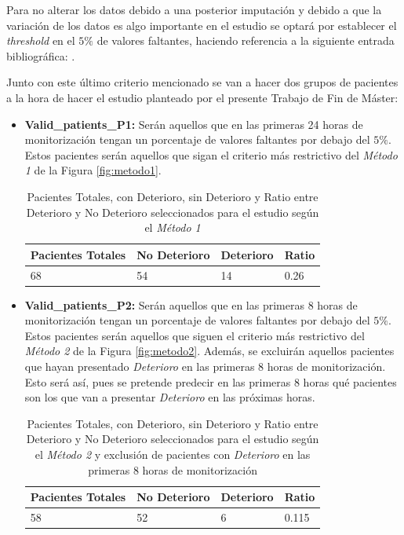 Para no alterar los datos debido a una posterior imputación y debido a que la variación de los datos es algo importante en el estudio se optará por establecer el \textit{threshold} en el $5 \%$ de valores faltantes, haciendo referencia a la siguiente entrada bibliográfica: \cite{Scheffer2002}. 

Junto con este último criterio mencionado se van a hacer dos grupos de pacientes a la hora de hacer el estudio planteado por el presente Trabajo de Fin de Máster:

\begin{itemize}
    \item \textbf{Valid\_patients\_P1:} Serán aquellos que en las primeras 24 horas de monitorización tengan un porcentaje de valores faltantes por debajo del $5\%$. Estos pacientes serán aquellos que sigan el criterio más restrictivo del \textit{Método 1} de la Figura \ref{fig:metodo1}. 
    \begin{table}[H]
        \centering
        \begin{tabular}{|m{2cm}|m{2.25cm}|m{2cm}|m{2cm}|}
        \hline
            Pacientes Totales & No Deterioro & Deterioro & Ratio \\ \hline
            68 & 54 & 14 & 0.26 \\ \hline
        \end{tabular}
        \caption{Pacientes Totales, con Deterioro, sin Deterioro y Ratio entre Deterioro y No Deterioro seleccionados para el estudio según el \textit{Método 1}}
            \label{tabla:ratio-deterioro-P1}
    \end{table}
    \item \textbf{Valid\_patients\_P2:} Serán aquellos que en las primeras $8$ horas de monitorización tengan un porcentaje de valores faltantes por debajo del $5\%$. Estos pacientes serán aquellos que siguen el criterio más restrictivo del \textit{Método 2} de la Figura \ref{fig:metodo2}. Además, se excluirán aquellos pacientes que hayan presentado \textit{Deterioro} en las primeras 8 horas de monitorización. Esto será así, pues se pretende predecir en las primeras $8$ horas qué pacientes son los que van a presentar \textit{Deterioro} en las próximas horas.
    \begin{table}[H]
        \centering
        \begin{tabular}{|m{2cm}|m{2.25cm}|m{2cm}|m{2cm}|}
        \hline
            Pacientes Totales & No Deterioro & Deterioro & Ratio \\ \hline
            58 & 52 & 6 & 0.115 \\ \hline
        \end{tabular}
        \caption{Pacientes Totales, con Deterioro, sin Deterioro y Ratio entre Deterioro y No Deterioro seleccionados para el estudio según el \textit{Método 2} y exclusión de pacientes con \textit{Deterioro} en las primeras 8 horas de monitorización}
            \label{tabla:ratio-deterioro-P1}
    \end{table}
\end{itemize}

